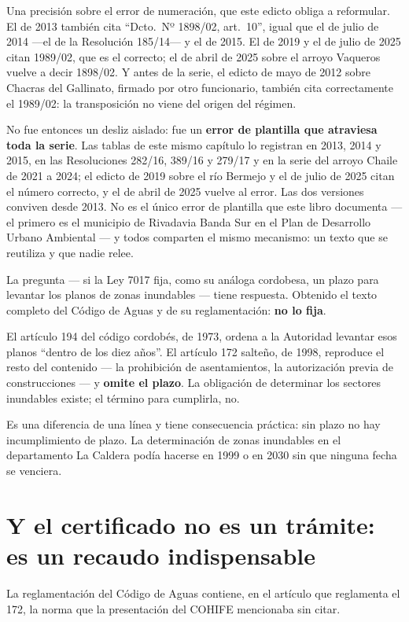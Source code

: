 Una precisión sobre el error de numeración, que este edicto obliga a reformular. El de 2013 también cita ``Dcto.\ Nº 1898/02, art.\ 10'', igual que el de julio de 2014 ---el de la Resolución 185/14--- y el de 2015. El de 2019 y el de julio de 2025 citan 1989/02, que es el correcto; el de abril de 2025 sobre el arroyo Vaqueros vuelve a decir 1898/02. Y antes de la serie, el edicto de mayo de 2012 sobre Chacras del Gallinato, firmado por otro funcionario, también cita correctamente el 1989/02: la transposición no viene del origen del régimen.

No fue entonces un desliz aislado: fue un \textbf{error de plantilla que atraviesa toda la serie}. Las tablas de este mismo capítulo lo registran en 2013, 2014 y 2015, en las Resoluciones 282/16, 389/16 y 279/17 y en la serie del arroyo Chaile de 2021 a 2024; el edicto de 2019 sobre el río Bermejo y el de julio de 2025 citan el número correcto, y el de abril de 2025 vuelve al error. Las dos versiones conviven desde 2013. No es el único error de plantilla que este libro documenta --- el primero es el municipio de Rivadavia Banda Sur en el Plan de Desarrollo Urbano Ambiental --- y todos comparten el mismo mecanismo: un texto que se reutiliza y que nadie relee.

La pregunta --- si la Ley 7017 fija, como su análoga cordobesa, un plazo para levantar los planos de zonas inundables --- tiene respuesta. Obtenido el texto completo del Código de Aguas y de su reglamentación: \textbf{no lo fija}.

El artículo 194 del código cordobés, de 1973, ordena a la Autoridad levantar esos planos ``dentro de los diez años''. El artículo 172 salteño, de 1998, reproduce el resto del contenido --- la prohibición de asentamientos, la autorización previa de construcciones --- y \textbf{omite el plazo}. La obligación de determinar los sectores inundables existe; el término para cumplirla, no.

Es una diferencia de una línea y tiene consecuencia práctica: sin plazo no hay incumplimiento de plazo. La determinación de zonas inundables en el departamento La Caldera podía hacerse en 1999 o en 2030 sin que ninguna fecha se venciera.

\section{Y el certificado no es un trámite: es un recaudo indispensable}

La reglamentación del Código de Aguas contiene, en el artículo que reglamenta el 172, la norma que la presentación del COHIFE mencionaba sin citar.

